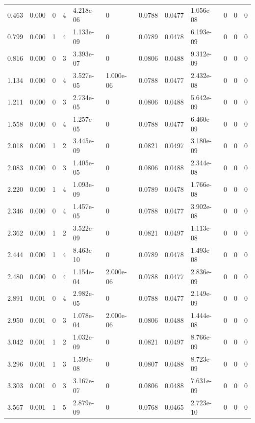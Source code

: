 \documentclass[preview]{standalone}
\begin{document}
{{\begin{tabular}{L{1.2cm}C{1.2cm} C{0.3cm}C{0.5cm} C{1.4cm}C{1.4cm} C{1.4cm}C{1.4cm} C{1.6cm}C{1.6cm} C{1.6cm}C{1.6cm}}
  0.463  &  0.000  & 0     &  4 &  4.218e-06  & 0  &  0.0788&   0.0477& 1.056e-08 & 0   &  0 & 0  \\ 
  0.799  &  0.000  & 1     &  4 &  1.133e-09  & 0  &  0.0789&   0.0478& 6.193e-09 & 0   &  0 & 0  \\ 
  0.816  &  0.000  & 0     &  3 &  3.393e-07  & 0  &  0.0806&   0.0488& 9.312e-09 & 0   &  0 & 0  \\ 
  1.134  &  0.000  & 0     &  4 &  3.527e-05  & 1.000e-06  &  0.0788&   0.0477& 2.432e-08 & 0   &  0 & 0  \\ 
  1.211  &  0.000  & 0     &  3 &  2.734e-05  & 0  &  0.0806&   0.0488& 5.642e-09 & 0   &  0 & 0  \\ 
  1.558  &  0.000  & 0     &  4 &  1.257e-05  & 0  &  0.0788&   0.0477& 6.460e-09 & 0   &  0 & 0  \\ 
  2.018  &  0.000  & 1     &  2 &  3.445e-09  & 0  &  0.0821&   0.0497& 3.180e-09 & 0   &  0 & 0  \\ 
  2.083  &  0.000  & 0     &  3 &  1.405e-05  & 0  &  0.0806&   0.0488& 2.344e-08 & 0   &  0 & 0  \\ 
  2.220  &  0.000  & 1     &  4 &  1.093e-09  & 0  &  0.0789&   0.0478& 1.766e-08 & 0   &  0 & 0  \\ 
  2.346  &  0.000  & 0     &  4 &  1.457e-05  & 0  &  0.0788&   0.0477& 3.902e-08 & 0   &  0 & 0  \\ 
  2.362  &  0.000  & 1     &  2 &  3.522e-09  & 0  &  0.0821&   0.0497& 1.113e-08 & 0   &  0 & 0  \\ 
  2.444  &  0.000  & 1     &  4 &  8.463e-10  & 0  &  0.0789&   0.0478& 1.493e-08 & 0   &  0 & 0  \\ 
  2.480  &  0.000  & 0     &  4 &  1.154e-04  & 2.000e-06  &  0.0788&   0.0477& 2.836e-09 & 0   &  0 & 0  \\ 
  2.891  &  0.001  & 0     &  4 &  2.982e-05  & 0  &  0.0788&   0.0477& 2.149e-09 & 0   &  0 & 0  \\ 
  2.950  &  0.001  & 0     &  3 &  1.078e-04  & 2.000e-06  &  0.0806&   0.0488& 1.444e-08 & 0   &  0 & 0  \\ 
  3.042  &  0.001  & 1     &  2 &  1.032e-09  & 0  &  0.0821&   0.0497& 8.766e-09 & 0   &  0 & 0  \\ 
  3.296  &  0.001  & 1     &  3 &  1.599e-08  & 0  &  0.0807&   0.0488& 8.723e-09 & 0   &  0 & 0  \\ 
  3.303  &  0.001  & 0     &  3 &  3.167e-07  & 0  &  0.0806&   0.0488& 7.631e-09 & 0   &  0 & 0  \\ 
  3.567  &  0.001  & 1     &  5 &  2.879e-09  & 0  &  0.0768&   0.0465& 2.723e-10 & 0   &  0 & 0  \\ 

\end{tabular}}}
\end{document}
